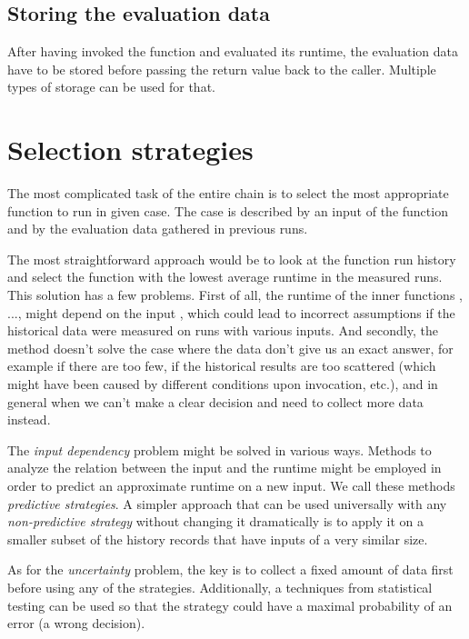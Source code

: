 \subsection{Storing the evaluation data}

After having invoked the function and evaluated its runtime, the evaluation data have to be stored before passing the return value back to the caller. Multiple types of storage can be used for that.


\section{Selection strategies}
\label{sec:selection_strategies}

The most complicated task of the entire chain is to select the most appropriate function to run in given case. The case is described by an input  of the function  and by the evaluation data gathered in previous runs.

The most straightforward approach would be to look at the function run history and select the function with the lowest average runtime in the measured runs. This solution has a few problems. First of all, the runtime of the inner functions , ...,  might depend on the input , which could lead to incorrect assumptions if the historical data were measured on runs with various inputs. And secondly, the method doesn't solve the case where the data don't give us an exact answer, for example if there are too few, if the historical results are too scattered (which might have been caused by different conditions upon invocation, etc.), and in general when we can't make a clear decision and need to collect more data instead.

The \textit{input dependency} problem might be solved in various ways. Methods to analyze the relation between the input and the runtime might be employed in order to predict an approximate runtime on a new input. We call these methods \textit{predictive strategies}. A simpler approach that can be used universally with any \textit{non-predictive strategy} without changing it dramatically is to apply it on a smaller subset of the history records that have inputs of a very similar size. 

As for the \textit{uncertainty} problem, the key is to collect a fixed amount of data first before using any of the strategies. Additionally, a techniques from statistical testing can be used so that the strategy could have a maximal probability of an error (a wrong decision).

